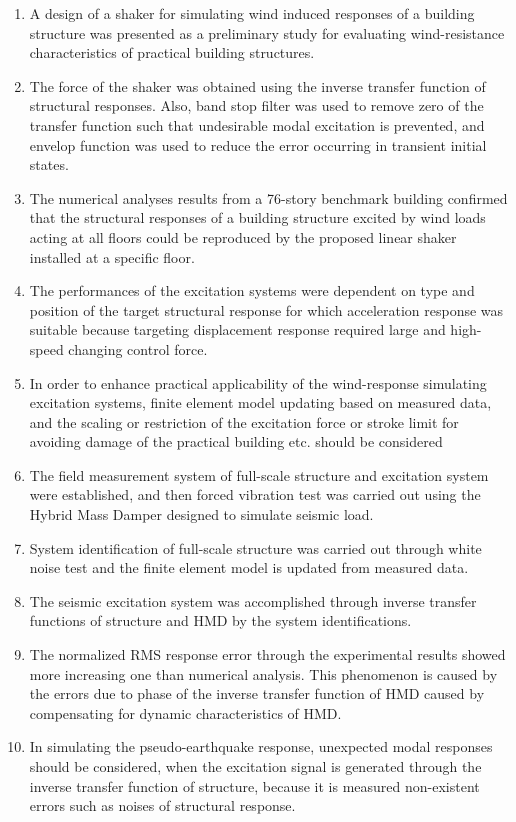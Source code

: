 \begin{enumerate}
\item A design of a shaker for simulating wind induced responses of a building structure was presented as a preliminary study for evaluating wind-resistance characteristics of practical building structures.
\item The force of the shaker was obtained using the inverse transfer function of structural responses. Also, band stop filter was used to remove zero of the transfer function such that undesirable modal excitation is prevented, and envelop function was used to reduce the error occurring in transient initial states. 
\item The numerical analyses results from a 76-story benchmark building confirmed that the structural responses of a building structure excited by wind loads acting at all floors could be reproduced by the proposed linear shaker installed at a specific floor.
\item The performances of the excitation systems were dependent on type and position of the target structural response for which acceleration response was suitable because targeting displacement response required large and high-speed changing control force.
\item In order to enhance practical applicability of the wind-response simulating excitation systems, finite element model updating based on measured data, and the scaling or restriction of the excitation force or stroke limit for avoiding damage of the practical building etc. should be considered
\item The field measurement system of full-scale structure and excitation system were established, and then forced vibration test was carried out using the Hybrid Mass Damper designed to simulate seismic load.
\item System identification of full-scale structure was carried out through white noise test and the finite element model is updated from measured data. 
\item The seismic excitation system was accomplished through inverse transfer functions of structure and HMD by the system identifications.
\item The normalized RMS response error through the experimental results showed more increasing one than numerical analysis. This phenomenon is caused by the errors due to phase of the inverse transfer function of HMD caused by compensating for dynamic characteristics of HMD.
\item In simulating the pseudo-earthquake response, unexpected modal responses should be considered, when the excitation signal is generated through the inverse transfer function of structure, because it is measured non-existent errors such as noises of structural response.

\end{enumerate}
